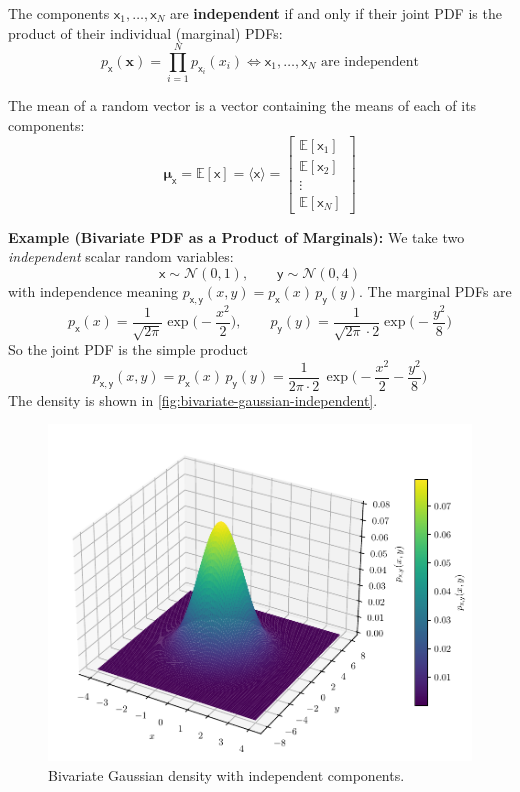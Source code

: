 The components $\mathsf{x}_1, \dots, \mathsf{x}_N$ are \textbf{independent} if and only if their joint PDF is the product of their individual (marginal) PDFs:
\begin{equation}
    p_{\boldsymbol{\mathsf{x}}}(\mathbf{x}) = \prod_{i=1}^N p_{\mathsf{x}_i}(x_i) \iff \mathsf{x}_1, \dots, \mathsf{x}_N \text{ are independent}
\end{equation}

The mean of a random vector is a vector containing the means of each of its components:
\begin{equation}
    \boldsymbol{\mu}_{\boldsymbol{\mathsf{x}}} = \mathbb{E}[\boldsymbol{\mathsf{x}}] = \langle \boldsymbol{\mathsf{x}} \rangle = 
\begin{bmatrix}
    \mathbb{E}[\mathsf{x}_1] \\
    \mathbb{E}[\mathsf{x}_2] \\
    \vdots \\
    \mathbb{E}[\mathsf{x}_N]
\end{bmatrix}
\end{equation}

\begin{exampleBox}
    \textbf{Example (Bivariate PDF as a Product of Marginals):}
    We take two \emph{independent} scalar random variables:
    \begin{equation}
    \mathsf{x}\sim\mathcal{N}(0,1),\qquad
    \mathsf{y}\sim\mathcal{N}(0,4)
    \end{equation}
    with independence meaning $p_{\mathsf{x},\mathsf{y}}(x,y)=p_{\mathsf{x}}(x)\,p_{\mathsf{y}}(y)$. The marginal PDFs are
    \begin{equation}
    p_{\mathsf{x}}(x)=\frac{1}{\sqrt{2\pi}}\exp\!\Big(-\frac{x^{2}}{2}\Big),
    \qquad
    p_{\mathsf{y}}(y)=\frac{1}{\sqrt{2\pi}\cdot 2}\exp\!\Big(-\frac{y^{2}}{8}\Big)
    \end{equation}
    So the joint PDF is the simple product
    \begin{equation}
        p_{\mathsf{x},\mathsf{y}}(x,y)
        = p_{\mathsf{x}}(x)\,p_{\mathsf{y}}(y)
        = \frac{1}{2\pi\cdot 2}\,
        \exp\!\Big(-\frac{x^{2}}{2}-\frac{y^{2}}{8}\Big)
    \end{equation}
    The density is shown in \autoref{fig:bivariate-gaussian-independent}.
    \begin{figure}[H]
        \centering
        \includegraphics[width=.5\textwidth]{figs/probability/bivariate_gaussian_independent.pdf}
        \caption{Bivariate Gaussian density with independent components.}
        \label{fig:bivariate-gaussian-independent}
    \end{figure}
\end{exampleBox}

